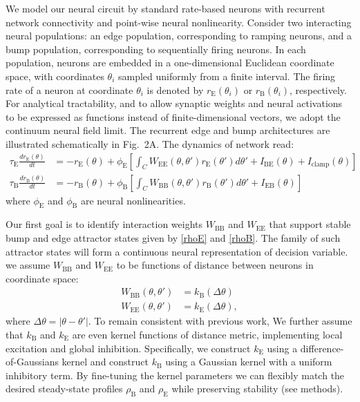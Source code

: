\documentclass{article}
\newcommand{\rB}{r_{\text{B}}}
\newcommand{\rE}{r_{\text{E}}}
\newcommand{\rhoE}{\rho_{\text{E}}}
\newcommand{\rhoB}{\rho_{\text{B}}}
\newcommand{\tauB}{\tau_{\text{B}}}
\newcommand{\tauE}{\tau_{\text{E}}}
\newcommand{\WBB}{W_{\text{BB}}}
\newcommand{\WEE}{W_{\text{EE}}}
\newcommand{\kB}{k_{\text{B}}}
\newcommand{\kE}{k_{\text{E}}}
\newcommand{\phiB}{\phi_{\text{B}}}
\newcommand{\phiE}{\phi_{\text{E}}}
\newcommand{\IBE}{I_{\text{BE}}}
\newcommand{\IEB}{I_{\text{EB}}}
\begin{document}
We model our neural circuit by standard rate-based neurons with recurrent network connectivity and point-wise neural nonlinearity. Consider two interacting neural populations: an edge population, corresponding to ramping neurons, and a bump population, corresponding to sequentially firing neurons. In each population, neurons are embedded in a one-dimensional Euclidean coordinate space, with coordinates $\theta_i$ sampled uniformly from a finite interval. The firing rate of a neuron at coordinate $\theta_i$ is denoted by $\rE(\theta_i)$ or $\rB(\theta_i)$, respectively. For analytical tractability, and to allow synaptic weights and neural activations to be expressed as functions instead of finite-dimensional vectors, we adopt the continuum neural field limit. The recurrent edge and bump architectures are illustrated schematically in Fig.~2A.
The dynamics of network read:
\begin{equation}
\begin{aligned}
\tauE \frac{d\rE(\theta)}{dt}
&= -\rE(\theta)+\phiE\left[\int_C
\WEE(\theta,\theta')\rE(\theta')d\theta'+ \IBE(\theta)+I_{\text{clamp}}(\theta)\right] \\[4pt]
\tauB \frac{d\rB(\theta)}{dt}
&= -\rB(\theta)+\phiB\left[\int_C \WBB(\theta,\theta')\rB(\theta')d\theta'+ \IEB(\theta)\right]
\label{neural_dynamics}
\end{aligned}
\end{equation}
where $\phiE$ and $\phiB$ are neural nonlinearities.

Our first goal is to identify interaction weights $\WBB$ and $\WEE$ that support stable bump and edge attractor states given by \eqref{rhoE} and \eqref{rhoB}. The family of such attractor states will form a continuous neural representation of decision variable.
we assume $\WBB$ and $\WEE$ to be functions of distance between neurons in coordinate space: 
\begin{equation}
    \begin{aligned}
       \WBB(\theta, \theta') &= \kB(\Delta \theta)\\
    \WEE(\theta, \theta') &= \kE(\Delta \theta), 
    \end{aligned}
\end{equation}
where $\Delta \theta = |\theta-\theta'|$.  To remain consistent with previous work, %
We further assume that $\kB$ and $\kE$ are even kernel functions of distance metric, implementing local excitation and global inhibition. Specifically, we construct $\kE$ using a difference-of-Gaussians kernel and construct $\kB$ using a Gaussian kernel with a uniform inhibitory term. By fine-tuning the kernel parameters we can flexibly match the desired steady-state profiles $\rhoB$ and $\rhoE$ while preserving stability (see methods).
\end{document}
